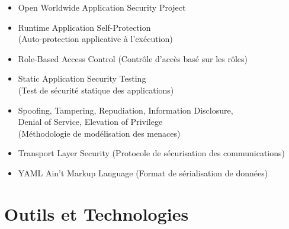 \begin{itemize}[leftmargin=2cm, labelwidth=1.8cm, align=left, itemsep=4pt]
  \item[\textbf{OWASP}] Open Worldwide Application Security Project

  \item[\textbf{RASP}] Runtime Application Self-Protection\\
        (Auto-protection applicative à l'exécution)

  \item[\textbf{RBAC}] Role-Based Access Control (Contrôle d'accès basé sur les rôles)

  \item[\textbf{SAST}] Static Application Security Testing\\
        (Test de sécurité statique des applications)

  \item[\textbf{STRIDE}] Spoofing, Tampering, Repudiation, Information Disclosure,\\
        Denial of Service, Elevation of Privilege\\
        (Méthodologie de modélisation des menaces)

  \item[\textbf{TLS}] Transport Layer Security (Protocole de sécurisation des communications)

  \item[\textbf{YAML}] YAML Ain't Markup Language (Format de sérialisation de données)

\end{itemize}

\newpage

\chapter*{Outils et Technologies}

